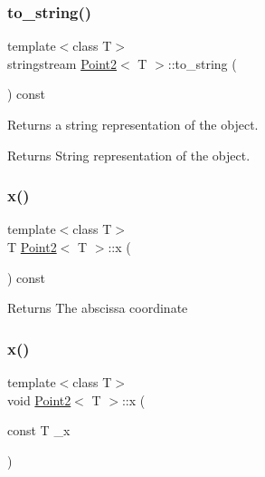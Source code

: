 \subsubsection{\texorpdfstring{to\_string()}{to\_string()}}
{\footnotesize\ttfamily template$<$class T$>$ \\
stringstream \mbox{\hyperlink{class_point2}{Point2}}$<$ T $>$\+::to\+\_\+string (\begin{DoxyParamCaption}{ }\end{DoxyParamCaption}) const\hspace{0.3cm}{\ttfamily [inline]}}



Returns a string representation of the object. 

\begin{DoxyReturn}{Returns}
String representation of the object. 
\end{DoxyReturn}
\mbox{\label{class_point2_adbf149d6f50de0d91c714a3fc45a80c5}} 
\subsubsection{\texorpdfstring{x()}{x()}\hspace{0.1cm}{\footnotesize\ttfamily [1/2]}}
{\footnotesize\ttfamily template$<$class T$>$ \\
T \mbox{\hyperlink{class_point2}{Point2}}$<$ T $>$\+::x (\begin{DoxyParamCaption}{ }\end{DoxyParamCaption}) const\hspace{0.3cm}{\ttfamily [inline]}}

\begin{DoxyReturn}{Returns}
The abscissa coordinate 
\end{DoxyReturn}
\mbox{\label{class_point2_a0693b1a0d34cb1dd3a4d30ea078a4d5e}} 
\subsubsection{\texorpdfstring{x()}{x()}\hspace{0.1cm}{\footnotesize\ttfamily [2/2]}}
{\footnotesize\ttfamily template$<$class T$>$ \\
void \mbox{\hyperlink{class_point2}{Point2}}$<$ T $>$\+::x (\begin{DoxyParamCaption}\item[{const T}]{\+\_\+x }\end{DoxyParamCaption})\hspace{0.3cm}{\ttfamily [inline]}}



